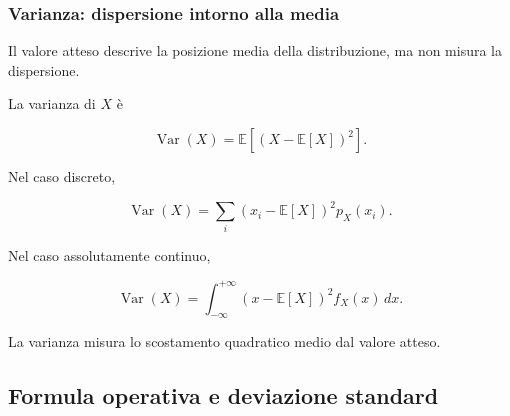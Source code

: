 \documentclass[handout]{beamer}%
\providecommand{\E}{\mathbb{E}}
\providecommand{\1}{\mathbf{1}}
\providecommand{\Var}{\operatorname{Var}}
\providecommand{\QTR}[2]{\csname #1\endcsname{#2}}
\begin{document}
\begin{frame}%
%

\frametitle{Varianza: dispersione intorno alla media}%


Il valore atteso descrive la posizione media della distribuzione, ma non
misura la dispersione.

\medskip

La varianza di $X$ \`{e}%

\[
\Var(X) = \E\left[ (X-\E[X])^{2}\right] .
\]


\medskip

Nel caso discreto,%

\[
\Var(X) = \sum_{i} (x_{i}-\E[X])^{2}p_{X}(x_{i}).
\]


\medskip

Nel caso assolutamente continuo,%

\[
\Var(X) = \int_{-\infty}^{+\infty}(x-\E[X])^{2}f_{X}(x)\,dx.
\]


\medskip

La varianza misura lo scostamento quadratico medio dal valore atteso.%

\transboxout
\end{frame}%




\subsection{Formula operativa e deviazione standard}%
\end{document}
